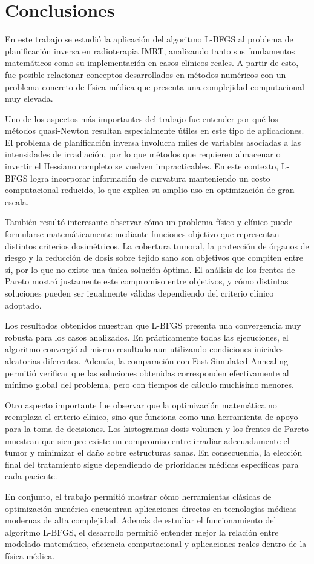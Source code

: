 \section{Conclusiones}

En este trabajo se estudió la aplicación del algoritmo L-BFGS al problema de planificación inversa en radioterapia IMRT, analizando tanto sus fundamentos matemáticos como su implementación en casos clínicos reales. A partir de esto, fue posible relacionar conceptos desarrollados en métodos numéricos con un problema concreto de física médica que presenta una complejidad computacional muy elevada.

Uno de los aspectos más importantes del trabajo fue entender por qué los métodos quasi-Newton resultan especialmente útiles en este tipo de aplicaciones. El problema de planificación inversa involucra miles de variables asociadas a las intensidades de irradiación, por lo que métodos que requieren almacenar o invertir el Hessiano completo se vuelven impracticables. En este contexto, L-BFGS logra incorporar información de curvatura manteniendo un costo computacional reducido, lo que explica su amplio uso en optimización de gran escala.

También resultó interesante observar cómo un problema físico y clínico puede formularse matemáticamente mediante funciones objetivo que representan distintos criterios dosimétricos. La cobertura tumoral, la protección de órganos de riesgo y la reducción de dosis sobre tejido sano son objetivos que compiten entre sí, por lo que no existe una única solución óptima. El análisis de los frentes de Pareto mostró justamente este compromiso entre objetivos, y cómo distintas soluciones pueden ser igualmente válidas dependiendo del criterio clínico adoptado.

Los resultados obtenidos muestran que L-BFGS presenta una convergencia muy robusta para los casos analizados. En prácticamente todas las ejecuciones, el algoritmo convergió al mismo resultado aun utilizando condiciones iniciales aleatorias diferentes. Además, la comparación con Fast Simulated Annealing permitió verificar que las soluciones obtenidas corresponden efectivamente al mínimo global del problema, pero con tiempos de cálculo muchísimo menores.

Otro aspecto importante fue observar que la optimización matemática no reemplaza el criterio clínico, sino que funciona como una herramienta de apoyo para la toma de decisiones. Los histogramas dosis-volumen y los frentes de Pareto muestran que siempre existe un compromiso entre irradiar adecuadamente el tumor y minimizar el daño sobre estructuras sanas. En consecuencia, la elección final del tratamiento sigue dependiendo de prioridades médicas específicas para cada paciente.

En conjunto, el trabajo permitió mostrar cómo herramientas clásicas de optimización numérica encuentran aplicaciones directas en tecnologías médicas modernas de alta complejidad. Además de estudiar el funcionamiento del algoritmo L-BFGS, el desarrollo permitió entender mejor la relación entre modelado matemático, eficiencia computacional y aplicaciones reales dentro de la física médica.
